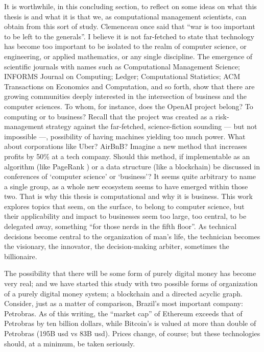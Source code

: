 It is worthwhile, in this concluding section, to reflect on some ideas on what this thesis is and what it is that we, as computational management scientists, can obtain from this sort of study.  Clemenceau once said that ``war is too important to be left to the generals''.  I believe it is not far-fetched to state that technology has become too important to be isolated to the realm of computer science, or engineering, or applied mathematics, or any single discipline.  The emergence of scientific journals with names such as Computational Management Science; INFORMS Journal on Computing; Ledger; Computational Statistics; ACM Transactions on Economics and Computation, and so forth, show that there are growing communities deeply interested in the intersection of business and the computer sciences.  To whom, for instance, does the OpenAI project belong?  To computing or to business?  Recall that the project was created as a risk-management strategy against the far-fetched, science-fiction sounding --- but not impossible ---, possibility of having machines yielding too much power.  What about corporations like Uber?  AirBnB?  Imagine a new method that increases profits by 50\% at a tech company.  Should this method, if implementable as an algorithm (like PageRank \citep{brin1998anatomy}) or a data structure (like a blockchain) be discussed in conferences of `computer science' or `business'? It seems quite arbitrary to name a single group, as a whole new ecosystem seems to have emerged within those two. That is why this thesis is computational and why it is business.  This work explores topics that seem, on the surface, to belong to computer science, but their applicability and impact to businesses seem too large, too central, to be delegated away, something ``for those nerds in the fifth floor''.  As technical decisions become central to the organization of man's life, the technician becomes the visionary, the innovator, the decision-making arbiter, sometimes the billionaire.

The possibility that there will be some form of purely digital money has become very real; and we have started this study with two possible forms of organization of a purely digital money system; a blockchain and a directed acyclic graph.  Consider, just as a matter of comparison, Brazil's most important company: Petrobras.  As of this writing, the ``market cap'' of Ethereum exceeds that of Petrobras by ten billion dollars, while Bitcoin's is valued at more than double of Petrobras (195B usd vs 83B usd).  Prices change, of course; but these technologies should, at a minimum, be taken seriously.



